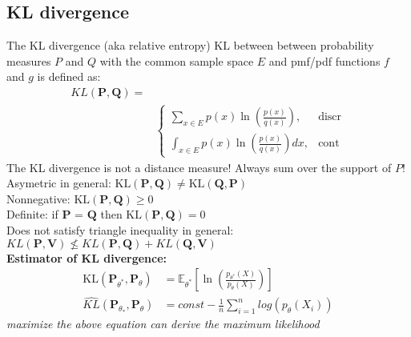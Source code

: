 \subsection{KL divergence}
The KL divergence (aka relative entropy) $\text {KL}$ between between probability measures $P$ and $Q$ with the common sample space $E$ and pmf/pdf functions $f$ and $g$ is defined as:
\begin{align*}
  {KL}(\mathbf{P}, \mathbf{Q}) = &\\
	&\begin{cases}
		  \sum _{x \in E} p(x) \ln \left( \frac{p(x)}{q(x)} \right),&\text{discr}\\	 
		{\int }_{x \in E} p(x) \ln \left( \frac{p(x)}{q(x)}\right)dx,&\text{cont}
	\end{cases}
\end{align*}
The KL divergence is not a distance measure! Always sum over the support of $P$!\\
Asymetric in general: $\text {KL}(\mathbf{P}, \mathbf{Q}) \neq \text {KL}(\mathbf{Q}, \mathbf{P})$\\
Nonnegative: $\text {KL}(\mathbf{P}, \mathbf{Q}) \geq 0$\\
Definite: if $\mathbf{P}$ = $\mathbf{Q}$ then $\text {KL}(\mathbf{P}, \mathbf{Q}) = 0$\\
Does not satisfy triangle inequality in general: $KL(\mathbf{P}, \mathbf{V}) \nleq KL(\mathbf{P}, \mathbf{Q}) + KL(\mathbf{Q}, \mathbf{V})$\\

\textbf{Estimator of KL divergence:}
\begin{align*}
\displaystyle  \text {KL}\left(\mathbf{P}_{\theta ^*}, \mathbf{P}_{\theta }\right)& = \mathbb {E}_{\theta ^*}\left[\ln \left(\frac{p_{\theta ^*}(X)}{p_{\theta }(X)}\right)\right]\\
\widehat{KL}(\mathbf{P}_{\theta_{*}},\mathbf{P}_{\theta})& = const - \frac{1}{n} \sum_{i=1}^{n} log(p_{\theta}(X_i))
\end{align*}
\textit{maximize the above equation can derive the maximum likelihood}